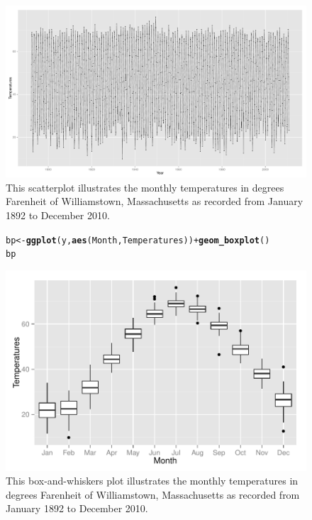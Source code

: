 \documentclass{article}\usepackage{graphicx, color}
\makeatletter
\def\maxwidth{ %
  \ifdim\Gin@nat@width>\linewidth
    \linewidth
  \else
    \Gin@nat@width
  \fi
}
\newcommand{\hlfunctioncall}[1]{\textcolor[rgb]{0.501960784313725,0,0.329411764705882}{\textbf{#1}}}%
\newenvironment{kframe}{%
 \def\at@end@of@kframe{}%
 \ifinner\ifhmode%
  \def\at@end@of@kframe{\end{minipage}}%
  \begin{minipage}{\columnwidth}%
 \fi\fi%
 \def\FrameCommand##1{\hskip\@totalleftmargin \hskip-\fboxsep
 \colorbox{shadecolor}{##1}\hskip-\fboxsep
     \hskip-\linewidth \hskip-\@totalleftmargin \hskip\columnwidth}%
 \MakeFramed {\advance\hsize-\width
   \@totalleftmargin\z@ \linewidth\hsize
   \@setminipage}}%
 {\par\unskip\endMakeFramed%
 \at@end@of@kframe}
\newenvironment{knitrout}{}{} %
\makeatother
\begin{document}
\begin{landscape}
  \begin{figure}
\begin{knitrout}
\color{fgcolor}
\includegraphics[width=\maxwidth]{figure/graph1Landscape} 

\end{knitrout}

\caption{This scatterplot illustrates the monthly temperatures in degrees
  Farenheit of Williamstown, Massachusetts as recorded from January
  1892 to December 2010.}
\end{figure}
\end{landscape}
\begin{figure}
\begin{knitrout}
\color{fgcolor}\begin{kframe}
\begin{alltt}
bp <- \hlfunctioncall{ggplot}(y, \hlfunctioncall{aes}(Month, Temperatures)) + \hlfunctioncall{geom_boxplot}()
bp
\end{alltt}
\end{kframe}
\includegraphics[width=\maxwidth]{figure/graph1_5} 

\end{knitrout}


\caption{This box-and-whiskers plot illustrates the monthly
  temperatures in degrees Farenheit of Williamstown, Massachusetts as recorded from January 1892 to December 2010.}
\end{figure}
\end{document}
